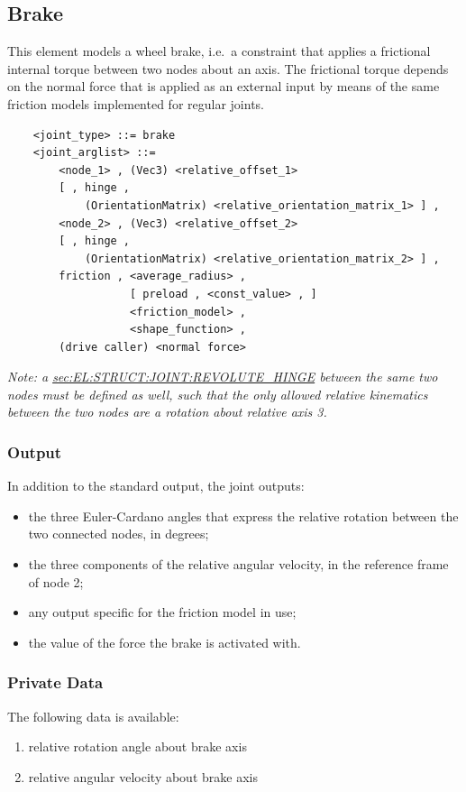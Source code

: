 \subsection{Brake}
This element models a wheel brake, i.e.\ a constraint that applies
a frictional internal torque between two nodes about an axis.
The frictional torque depends on the normal force that is applied 
as an external input by means of the same friction models implemented
for regular joints.
\begin{verbatim}
    <joint_type> ::= brake
    <joint_arglist> ::= 
        <node_1> , (Vec3) <relative_offset_1> 
        [ , hinge , 
            (OrientationMatrix) <relative_orientation_matrix_1> ] ,
        <node_2> , (Vec3) <relative_offset_2>
        [ , hinge , 
            (OrientationMatrix) <relative_orientation_matrix_2> ] ,
        friction , <average_radius> , 
                   [ preload , <const_value> , ]
                   <friction_model> , 
                   <shape_function> ,
        (drive caller) <normal force>
\end{verbatim}
\emph{Note: a
\hyperref{\kw{revolute hinge}}{\kw{revolute hinge} (see Section~}{)}{sec:EL:STRUCT:JOINT:REVOLUTE_HINGE}
between the same two nodes must be defined as well, such that
the only allowed relative kinematics between the two nodes are
a rotation about relative axis 3.
}

\subsubsection{Output}
In addition to the standard output, the  joint outputs:
\begin{itemize}
\item the three Euler-Cardano angles that express the relative rotation
	between the two connected nodes, in degrees;
\item the three components of the relative angular velocity,
	in the reference frame of node 2;
\item any output specific for the friction model in use;
\item the value of the force the brake is activated with.
\end{itemize}

\subsubsection{Private Data}
The following data is available:
\begin{enumerate}
\item {} relative rotation angle about brake axis
\item {} relative angular velocity about brake axis
\end{enumerate}




